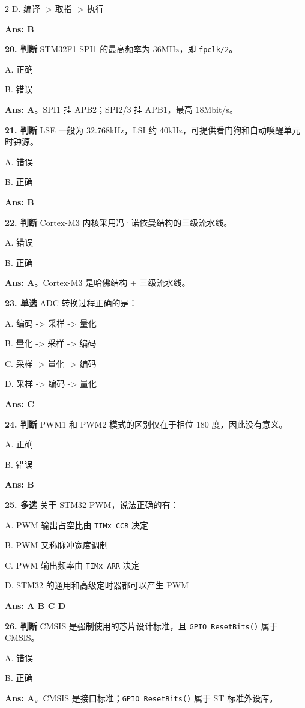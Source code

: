 \documentclass[UTF8,zihao=-5]{ctexart}
\begin{document}
\begin{multicols*}{2}
D. 编译 -> 取指 -> 执行\par
\textbf{Ans: B}\par
\textbf{20. 判断} STM32F1 SPI1 的最高频率为 36MHz，即 \texttt{fpclk/2}。\par
A. 正确\par
B. 错误\par
\textbf{Ans: A}。SPI1 挂 APB2；SPI2/3 挂 APB1，最高 18Mbit/s。\par
\textbf{21. 判断} LSE 一般为 32.768kHz，LSI 约 40kHz，可提供看门狗和自动唤醒单元时钟源。\par
A. 错误\par
B. 正确\par
\textbf{Ans: B}\par
\textbf{22. 判断} Cortex-M3 内核采用冯·诺依曼结构的三级流水线。\par
A. 错误\par
B. 正确\par
\textbf{Ans: A}。Cortex-M3 是哈佛结构 + 三级流水线。\par
\textbf{23. 单选} ADC 转换过程正确的是：\par
A. 编码 -> 采样 -> 量化\par
B. 量化 -> 采样 -> 编码\par
C. 采样 -> 量化 -> 编码\par
D. 采样 -> 编码 -> 量化\par
\textbf{Ans: C}\par
\textbf{24. 判断} PWM1 和 PWM2 模式的区别仅在于相位 180 度，因此没有意义。\par
A. 正确\par
B. 错误\par
\textbf{Ans: B}\par
\textbf{25. 多选} 关于 STM32 PWM，说法正确的有：\par
A. PWM 输出占空比由 \texttt{TIMx\_CCR} 决定\par
B. PWM 又称脉冲宽度调制\par
C. PWM 输出频率由 \texttt{TIMx\_ARR} 决定\par
D. STM32 的通用和高级定时器都可以产生 PWM\par
\textbf{Ans: A B C D}\par
\textbf{26. 判断} CMSIS 是强制使用的芯片设计标准，且 \texttt{GPIO\_ResetBits()} 属于 CMSIS。\par
A. 错误\par
B. 正确\par
\textbf{Ans: A}。CMSIS 是接口标准；\texttt{GPIO\_ResetBits()} 属于 ST 标准外设库。\par

\end{multicols*}
\end{document}
